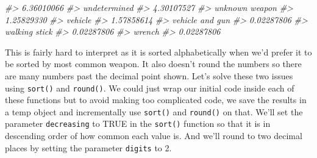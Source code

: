 \documentclass[
]{krantz}
\makeatletter
\newenvironment{Shaded}{\begin{snugshade}}{\end{snugshade}}
\newcommand{\CommentTok}[1]{\textcolor[rgb]{0.37,0.37,0.37}{\textit{#1}}}
\newenvironment{kframe}{%
\medskip{}
\setlength{\fboxsep}{.8em}
 \def\at@end@of@kframe{}%
 \ifinner\ifhmode%
  \def\at@end@of@kframe{\end{minipage}}%
  \begin{minipage}{\columnwidth}%
 \fi\fi%
 \def\FrameCommand##1{\hskip\@totalleftmargin \hskip-\fboxsep
 \colorbox{shadecolor}{##1}\hskip-\fboxsep
     \hskip-\linewidth \hskip-\@totalleftmargin \hskip\columnwidth}%
 \MakeFramed {\advance\hsize-\width
   \@totalleftmargin\z@ \linewidth\hsize
   \@setminipage}}%
 {\par\unskip\endMakeFramed%
 \at@end@of@kframe}
\renewenvironment{Shaded}{\begin{kframe}}{\end{kframe}}
\makeatother
\begin{document}
\begin{Shaded}
\begin{Highlighting}[]
\CommentTok{\#\textgreater{}                       6.36010066 }
\CommentTok{\#\textgreater{}                     undetermined }
\CommentTok{\#\textgreater{}                       4.30107527 }
\CommentTok{\#\textgreater{}                   unknown weapon }
\CommentTok{\#\textgreater{}                       1.25829330 }
\CommentTok{\#\textgreater{}                          vehicle }
\CommentTok{\#\textgreater{}                       1.57858614 }
\CommentTok{\#\textgreater{}                  vehicle and gun }
\CommentTok{\#\textgreater{}                       0.02287806 }
\CommentTok{\#\textgreater{}                    walking stick }
\CommentTok{\#\textgreater{}                       0.02287806 }
\CommentTok{\#\textgreater{}                           wrench }
\CommentTok{\#\textgreater{}                       0.02287806}
\end{Highlighting}
\end{Shaded}

This is fairly hard to interpret as it is sorted alphabetically when we'd prefer it to be sorted by most common weapon. It also doesn't round the numbers so there are many numbers past the decimal point shown. Let's solve these two issues using \texttt{sort()} and \texttt{round()}. We could just wrap our initial code inside each of these functions but to avoid making too complicated code, we save the results in a temp object and incrementally use \texttt{sort()} and \texttt{round()} on that. We'll set the parameter \texttt{decreasing} to TRUE in the \texttt{sort()} function so that it is in descending order of how common each value is. And we'll round to two decimal places by setting the parameter \texttt{digits} to 2.
\end{document}
